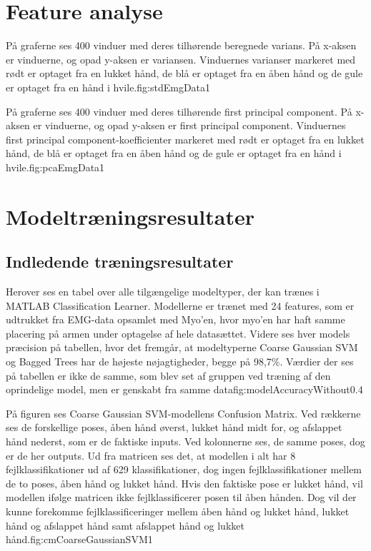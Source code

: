 \thispagestyle{fancy}




\chapter{Feature analyse}
{På graferne ses 400 vinduer med deres tilhørende beregnede varians. På x-aksen er vinduerne, og opad y-aksen er variansen. Vinduernes varianser markeret med rødt er optaget fra en lukket hånd, de blå er optaget fra en åben hånd og de gule er optaget fra en hånd i hvile.}{fig:stdEmgData}{1}
 
{På graferne ses 400 vinduer med deres tilhørende first principal component. På x-aksen er vinduerne, og opad y-aksen er first principal component. Vinduernes first principal component-koefficienter markeret med rødt er optaget fra en lukket hånd, de blå er optaget fra en åben hånd og de gule er optaget fra en hånd i hvile.}{fig:pcaEmgData}{1}

\chapter{Modeltræningsresultater}
\section{Indledende træningsresultater}
{Herover ses en tabel over alle tilgængelige modeltyper, der kan trænes i MATLAB Classification Learner. Modellerne er trænet med 24 features, som er udtrukket fra EMG-data opsamlet med Myo'en, hvor myo'en har haft samme placering på armen under optagelse af hele datasættet. Videre ses hver models præcision på tabellen, hvor det fremgår, at modeltyperne Coarse Gaussian SVM og Bagged Trees har de højeste nøjagtigheder, begge på 98,7\%. Værdier der ses på tabellen er ikke de samme, som blev set af gruppen ved træning af den oprindelige model, men er genskabt fra samme data}{fig:modelAccuracyWithout}{0.4}

{På figuren ses Coarse Gaussian SVM-modellens Confusion Matrix. Ved rækkerne ses de forskellige poses, åben hånd øverst, lukket hånd midt for, og afslappet hånd nederst, som er de faktiske inputs. Ved kolonnerne ses, de samme poses, dog er de her outputs. Ud fra matricen ses det, at modellen i alt har 8 fejlklassifikationer ud af 629 klassifikationer, dog ingen fejlklassifikationer mellem de to poses, åben hånd og lukket hånd. Hvis den faktiske pose er lukket hånd, vil modellen ifølge matricen ikke fejlklassificerer posen til åben hånden. Dog vil der kunne forekomme fejlklassificeringer mellem åben hånd og lukket hånd, lukket hånd og afslappet hånd samt afslappet hånd og lukket hånd.}{fig:cmCoarseGaussianSVM}{1} 


